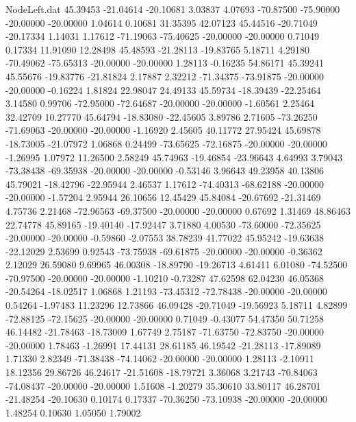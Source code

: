 \begin{filecontents}{NodeLeft.dat}
  45.39453  -21.04614  -20.10681     3.03837    4.07693  -70.87500  -75.90000  -20.00000  -20.00000    1.04614    0.10681   31.35395   42.07123
  45.44516  -20.71049  -20.17334     1.14031    1.17612  -71.19063  -75.40625  -20.00000  -20.00000    0.71049    0.17334   11.91090   12.28498
  45.48593  -21.28113  -19.83765     5.18711    4.29180  -70.49062  -75.65313  -20.00000  -20.00000    1.28113   -0.16235   54.86171   45.39241
  45.55676  -19.83776  -21.81824     2.17887    2.32212  -71.34375  -73.91875  -20.00000  -20.00000   -0.16224    1.81824   22.98047   24.49133
  45.59734  -18.39439  -22.25464     3.14580    0.99706  -72.95000  -72.64687  -20.00000  -20.00000   -1.60561    2.25464   32.42709   10.27770
  45.64794  -18.83080  -22.45605     3.89786    2.71605  -73.26250  -71.69063  -20.00000  -20.00000   -1.16920    2.45605   40.11772   27.95424
  45.69878  -18.73005  -21.07972     1.06868    0.24499  -73.65625  -72.16875  -20.00000  -20.00000   -1.26995    1.07972   11.26500    2.58249
  45.74963  -19.46854  -23.96643     4.64993    3.79043  -73.38438  -69.35938  -20.00000  -20.00000   -0.53146    3.96643   49.23958   40.13806
  45.79021  -18.42796  -22.95944     2.46537    1.17612  -74.40313  -68.62188  -20.00000  -20.00000   -1.57204    2.95944   26.10656   12.45429
  45.84084  -20.67692  -21.31469     4.75736    2.21468  -72.96563  -69.37500  -20.00000  -20.00000    0.67692    1.31469   48.86463   22.74778
  45.89165  -19.40140  -17.92447     3.71880    4.00530  -73.60000  -72.35625  -20.00000  -20.00000   -0.59860   -2.07553   38.78239   41.77022
  45.95242  -19.63638  -22.12029     2.53699    0.92543  -73.75938  -69.61875  -20.00000  -20.00000   -0.36362    2.12029   26.59080    9.69965
  46.00308  -18.89790  -19.26713     4.61411    6.01080  -74.52500  -70.97500  -20.00000  -20.00000   -1.10210   -0.73287   47.62598   62.04230
  46.05368  -20.54264  -18.02517     1.06868    1.21193  -73.45312  -72.78438  -20.00000  -20.00000    0.54264   -1.97483   11.23296   12.73866
  46.09428  -20.71049  -19.56923     5.18711    4.82899  -72.88125  -72.15625  -20.00000  -20.00000    0.71049   -0.43077   54.47350   50.71258
  46.14482  -21.78463  -18.73009     1.67749    2.75187  -71.63750  -72.83750  -20.00000  -20.00000    1.78463   -1.26991   17.44131   28.61185
  46.19542  -21.28113  -17.89089     1.71330    2.82349  -71.38438  -74.14062  -20.00000  -20.00000    1.28113   -2.10911   18.12356   29.86726
  46.24617  -21.51608  -18.79721     3.36068    3.21743  -70.84063  -74.08437  -20.00000  -20.00000    1.51608   -1.20279   35.30610   33.80117
  46.28701  -21.48254  -20.10630     0.10174    0.17337  -70.36250  -73.10938  -20.00000  -20.00000    1.48254    0.10630    1.05050    1.79002

\end{filecontents}
